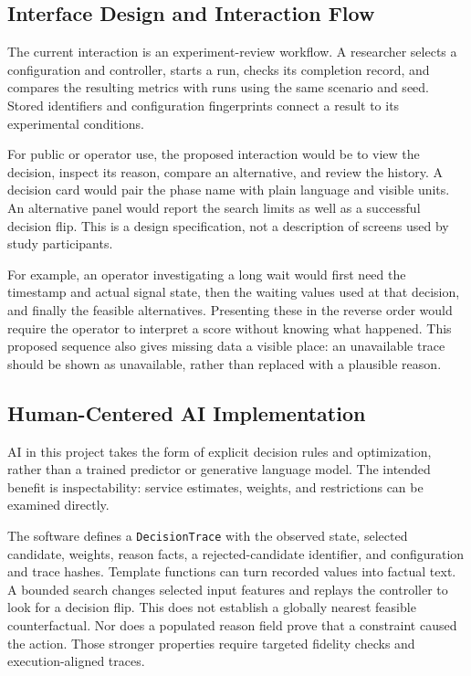 \documentclass[sigconf]{acmart}
\begin{document}
\subsection{Interface Design and Interaction Flow}
The current interaction is an experiment-review workflow. A
researcher selects a configuration and controller, starts a run,
checks its completion record, and compares the resulting metrics
with runs using the same scenario and seed. Stored identifiers and
configuration fingerprints connect a result to its experimental
conditions.

For public or operator use, the proposed interaction would be to
view the decision, inspect its reason, compare an alternative, and
review the history. A decision card would pair the phase name with
plain language and visible units. An alternative panel would report
the search limits as well as a successful decision flip. This is a
design specification, not a description of screens used by study
participants.

For example, an operator investigating a long wait would first need
the timestamp and actual signal state, then the waiting values used
at that decision, and finally the feasible alternatives. Presenting
these in the reverse order would require the operator to interpret a
score without knowing what happened. This proposed sequence also
gives missing data a visible place: an unavailable trace should be
shown as unavailable, rather than replaced with a plausible reason.

\subsection{Human-Centered AI Implementation}
AI in this project takes the form of explicit decision rules and
optimization, rather than a trained predictor or generative language
model. The intended benefit is inspectability: service estimates,
weights, and restrictions can be examined directly.

The software defines a \texttt{DecisionTrace} with the observed
state, selected candidate, weights, reason facts, a rejected-candidate
identifier, and configuration and trace hashes. Template functions
can turn recorded values into factual text. A bounded search changes
selected input features and replays the controller to look for a
decision flip. This does not establish a globally nearest feasible
counterfactual. Nor does a populated reason field prove that a
constraint caused the action. Those stronger properties require
targeted fidelity checks and execution-aligned traces.
\end{document}
